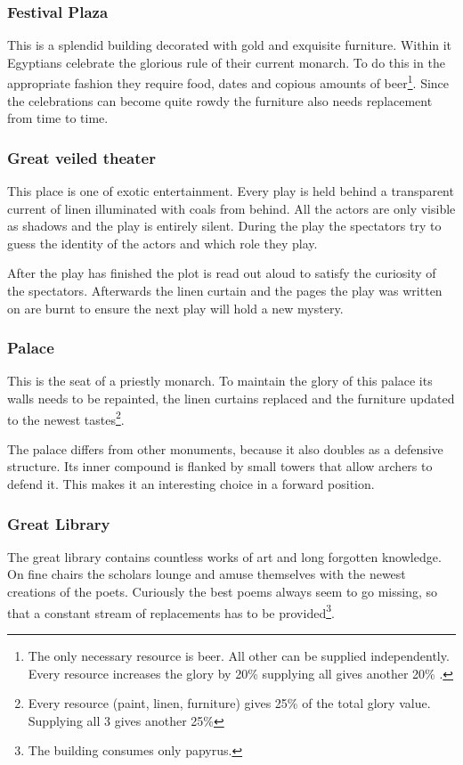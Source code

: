 \documentclass[a4paper]{article}
\begin{document}
		\subsubsection{Festival Plaza}
			This is a splendid building decorated with gold and exquisite furniture.
			Within it \gls{Egyptians} celebrate the glorious rule of their current monarch.
			To do this in the appropriate fashion they require food, dates and copious amounts of beer\footnote{
				The only necessary resource is beer. All other can be supplied independently.
				Every resource increases the glory by 20\%  supplying all gives another 20\% .
			}.
			Since the celebrations can become quite rowdy the furniture also needs replacement from time
			to time.

		\subsubsection{Great veiled theater}
			This place is one of exotic entertainment.
			Every play is held behind a transparent current of linen illuminated with coals from behind.
			All the actors are only visible as shadows and the play is entirely silent.
			During the play the spectators try to guess the identity of the actors
			and which role they play.

			After the play has finished the plot is read out aloud to satisfy the curiosity
			of the spectators.
			Afterwards the linen curtain and the pages the play was written on are burnt
			to ensure the next play will hold a new mystery.

		\subsubsection{Palace}
			This is the seat of a priestly monarch.
			To maintain the glory of this palace its walls needs to be repainted,
			the linen curtains replaced and the furniture updated to the newest tastes\footnote{
				Every resource (paint, linen, furniture) gives 25\% of the total glory value.
				Supplying all 3 gives another 25\%
			}.

			The palace differs from other monuments, because it also doubles as a defensive
			structure.
			Its inner compound is flanked by small towers that allow archers to defend it.
			This makes it an interesting choice in a forward position.

		\subsubsection{Great Library}
			The great library contains countless works of art and long forgotten knowledge.
			On fine chairs the scholars lounge and amuse themselves with the newest creations
			of the poets.
			Curiously the best poems always seem to go missing, so that a constant stream
			of replacements has to be provided\footnote{
				The building consumes only papyrus.
			}.
\end{document}
